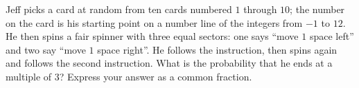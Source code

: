 Jeff picks a card at random from ten cards numbered $1$ through $10$; the number on the card is his starting point on a number line of the integers from $-1$ to $12$. He then spins a fair spinner with three equal sectors: one says ``move $1$ space left'' and two say ``move $1$ space right''. He follows the instruction, then spins again and follows the second instruction. What is the probability that he ends at a multiple of $3$? Express your answer as a common fraction.

